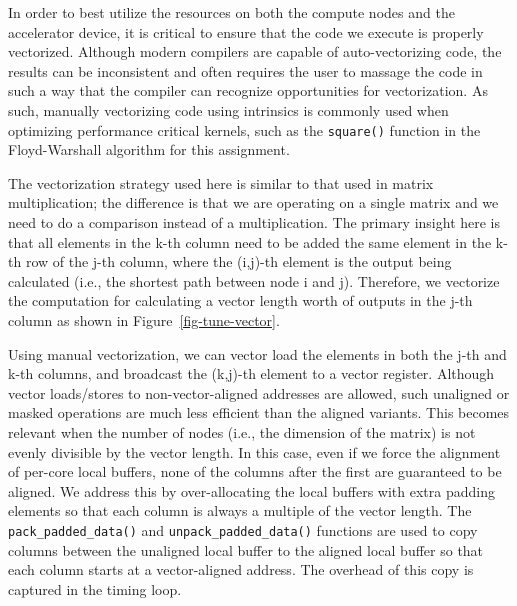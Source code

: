 In order to best utilize the resources on both the compute nodes and the
accelerator device, it is critical to ensure that the code we execute is
properly vectorized. Although modern compilers are capable of
auto-vectorizing code, the results can be inconsistent and often requires
the user to massage the code in such a way that the compiler can
recognize opportunities for vectorization. As such, manually vectorizing
code using intrinsics is commonly used when optimizing performance
critical kernels, such as the \texttt{square()} function in the
Floyd-Warshall algorithm for this assignment.



The vectorization strategy used here is similar to that used in matrix
multiplication; the difference is that we are operating on a single
matrix and we need to do a comparison instead of a multiplication. The
primary insight here is that all elements in the k-th column need to be
added the same element in the k-th row of the j-th column, where
the (i,j)-th element is the output being calculated (i.e., the shortest
path between node i and j). Therefore, we vectorize the computation for
calculating a vector length worth of outputs in the j-th column as shown
in Figure~\ref{fig-tune-vector}.

Using manual vectorization, we can vector load the elements in both the
j-th and k-th columns, and broadcast the (k,j)-th element to a vector
register. Although vector loads/stores to non-vector-aligned addresses are
allowed, such unaligned or masked operations are much less efficient
than the aligned variants. This becomes relevant when the number of nodes
(i.e., the dimension of the matrix) is not evenly divisible by the vector
length. In this case, even if we force the alignment of per-core local
buffers, none of the columns after the first are guaranteed to be
aligned. We address this by over-allocating the local buffers with extra
padding elements so that each column is always a multiple of the vector
length. The \texttt{pack\_padded\_data()} and
\texttt{unpack\_padded\_data()} functions are used to copy columns
between the unaligned local buffer to the aligned local buffer so that
each column starts at a vector-aligned address. The overhead of this copy
is captured in the timing loop.

